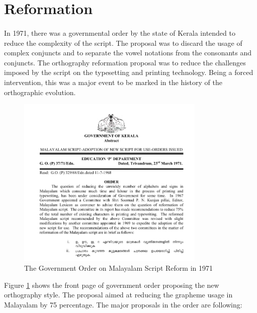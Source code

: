 \documentclass[10pt]{article}
\begin{document}
\section{Reformation}

\paragraph{}
In 1971, there was a governmental order by the state of Kerala intended to reduce the complexity of the script. The proposal was to discard the usage of complex conjuncts and to separate the vowel notations from the consonants and conjuncts. The orthography reformation proposal was to reduce the challenges imposed by the script on the typesetting and printing technology. Being a forced intervention, this was a major event to be marked in the history of the orthographic evolution. 

\begin{figure}[h!]
 \centering
  \includegraphics[width=0.8\textwidth]{images/1971-gov-script-reformation-order.png}
   \caption{The Government Order on Malayalam Script Reform in 1971}
	\label{go1971}
\end{figure}

Figure \ref{go1971} shows the front page of government order proposing the new orthography style. The proposal aimed at reducing the grapheme usage in Malayalam by 75 percentage. The major proposals in the order are following:\cite{1971go}
\end{document}
